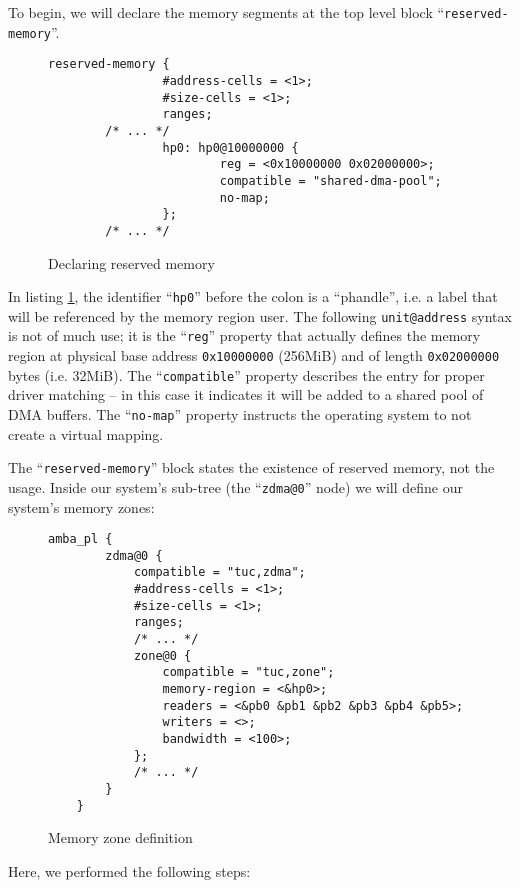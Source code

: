 To begin, we will declare the memory segments at the top level block ``\texttt{reserved-memory}''.

\begin{figure}[ht!]
\centering
\begin{lstlisting}[style=basic]
        reserved-memory {
                #address-cells = <1>;
                #size-cells = <1>;
                ranges;
		/* ... */
                hp0: hp0@10000000 {
                        reg = <0x10000000 0x02000000>;
                        compatible = "shared-dma-pool";
                        no-map;
                };
		/* ... */
\end{lstlisting}
\caption{Declaring reserved memory}
\label{lst:resmem}
\end{figure}

In listing \ref{lst:resmem}, the identifier ``\texttt{hp0}'' before the colon is a ``phandle'',
i.e. a label that will be referenced by
the memory region user. The following \texttt{unit@address} syntax is not of much use;
it is the ``\texttt{reg}'' property that actually defines the memory region
at physical base address \texttt{0x10000000} (256MiB) and of length \texttt{0x02000000} bytes (i.e. 32MiB).
The ``\texttt{compatible}'' property describes the entry for proper driver matching --
in this case it indicates it will be added to a shared pool of DMA buffers.
The ``\texttt{no-map}'' property instructs the operating system to not create a virtual mapping.

The ``\texttt{reserved-memory}'' block states the existence of reserved memory, not the usage.
Inside our system's sub-tree (the ``\texttt{zdma@0}'' node) we will define our system's memory zones:

\begin{figure}[ht!]
\centering
\begin{lstlisting}[style=basic]
	amba_pl {
		zdma@0 {
			compatible = "tuc,zdma";
			#address-cells = <1>;
			#size-cells = <1>;
			ranges;
			/* ... */
			zone@0 {
				compatible = "tuc,zone";
				memory-region = <&hp0>;
				readers = <&pb0 &pb1 &pb2 &pb3 &pb4 &pb5>;
				writers = <>;
				bandwidth = <100>;
			};
			/* ... */
		}
	}
\end{lstlisting}
\caption{Memory zone definition}
\label{lst:memzone}
\end{figure}

Here, we performed the following steps:


